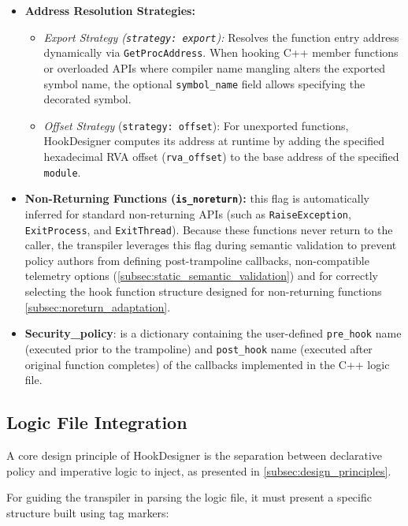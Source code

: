 \begin{itemize}
	\item \textbf{Address Resolution Strategies:}
	\begin{itemize}
		\item \emph{Export Strategy (\texttt{strategy: export}):} Resolves the function entry address dynamically via \texttt{GetProcAddress}. When hooking C++ member functions or overloaded APIs where compiler name mangling alters the exported symbol name, the optional \texttt{symbol\_name} field allows specifying the decorated symbol.
		\item \emph{Offset Strategy} (\texttt{strategy:}\allowbreak\ \texttt{offset}): For unexported functions, HookDesigner computes its address at runtime by adding the specified hexadecimal \ac{RVA} offset (\texttt{rva\_offset}) to the base address of the specified \texttt{module}.
	\end{itemize}
	
	\item \textbf{Non-Returning Functions (\texttt{is\_noreturn}):} this flag is automatically inferred for standard non-returning \acp{API} (such as \texttt{RaiseException}, \texttt{ExitProcess}, and \texttt{ExitThread}). Because these functions never return to the caller, the transpiler leverages this flag during semantic validation to prevent policy authors from defining post-trampoline callbacks, non-compatible telemetry options (\cref{subsec:static_semantic_validation}) and for correctly selecting the hook function structure designed for non-returning functions \cref{subsec:noreturn_adaptation}.
	\item \textbf{Security\_policy}: is a dictionary containing the user-defined \texttt{pre\_hook} name (executed prior to the trampoline) and \texttt{post\_hook} name (executed after original function completes) of the callbacks implemented in the C++ logic file.
\end{itemize}


\subsection{Logic File Integration}
\label{subsec:logic_file}

A core design principle of HookDesigner is the separation between declarative policy and imperative logic to inject, as presented in \cref{subsec:design_principles}.

For guiding the transpiler in parsing the logic file, it must present a specific structure built using tag markers:

